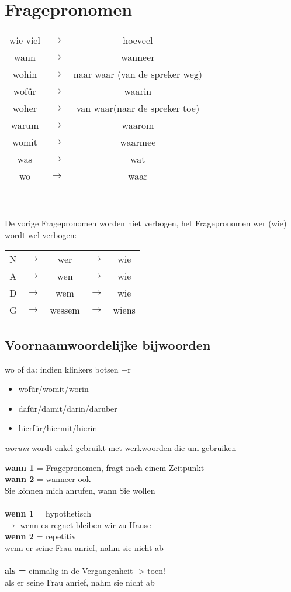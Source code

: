 \documentclass[main.tex]{subfiles}
\begin{document}
\section{Fragepronomen}
\begin{tabular}{ccc}
wie viel & $\rightarrow$ & hoeveel \\ 
wann & $\rightarrow$ & wanneer \\ 
wohin & $\rightarrow$ & naar waar (van de spreker weg) \\ 
wofür & $\rightarrow$ & waarin \\ 
woher & $\rightarrow$ & van waar(naar de spreker toe) \\ 
warum & $\rightarrow$ & waarom \\ 
womit & $\rightarrow$ & waarmee \\ 
was & $\rightarrow$ & wat \\ 
wo & $\rightarrow$ & waar \\ 
\end{tabular} \\
\\
De vorige Fragepronomen worden niet verbogen, het Fragepronomen wer (wie) wordt wel verbogen:\\
\begin{tabular}{ccccc}
N & $\rightarrow$ & wer & $\rightarrow$ & wie\\
A & $\rightarrow$ & wen & $\rightarrow$ & wie\\
D & $\rightarrow$ & wem & $\rightarrow$ & wie\\
G & $\rightarrow$ & wessem & $\rightarrow$ & wiens\\
\end{tabular} 

\subsection{Voornaamwoordelijke bijwoorden}
wo of da: indien klinkers botsen +r
\begin{itemize}
\item wofür/womit/worin
\item dafür/damit/darin/daruber
\item hierfür/hiermit/hierin
\end{itemize}

\textit{worum} wordt enkel gebruikt met werkwoorden die um gebruiken

\textbf{wann 1} = Fragepronomen, fragt nach einem Zeitpunkt\\
\textbf{wann 2} = wanneer ook\\
Sie können mich anrufen, wann Sie wollen\\
\\
\textbf{wenn 1} = hypothetisch\\
$\rightarrow$ wenn es regnet bleiben wir zu Hause \\
\textbf{wenn 2} = repetitiv\\
wenn er seine Frau anrief, nahm sie nicht ab\\
\\
\textbf{als =} einmalig in de Vergangenheit -> toen!\\
als er seine Frau anrief, nahm sie nicht ab
\end{document}
